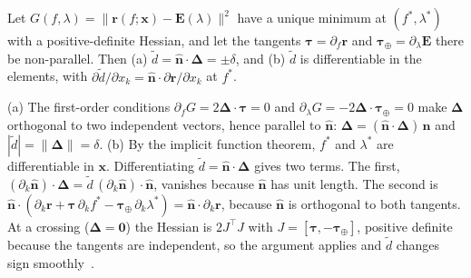 \begin{proposition}\label{prop:grad}
Let $G(f, \lambda) = \lVert\mathbf{r}(f; \mathbf{x}) - \mathbf{E}(\lambda)\rVert^2$ have a unique minimum at $(f^*, \lambda^*)$ with a positive-definite Hessian, and let the tangents $\boldsymbol\tau = \partial_f\mathbf{r}$ and $\boldsymbol\tau_\oplus = \partial_\lambda\mathbf{E}$ there be non-parallel. Then (a) $\tilde d = \hat{\mathbf{n}}\cdot\boldsymbol\Delta = \pm\delta$, and (b) $\tilde d$ is differentiable in the elements, with $\partial\tilde d/\partial x_k = \hat{\mathbf{n}}\cdot\partial\mathbf{r}/\partial x_k$ at $f^*$.
\end{proposition}
\begin{IEEEproof}
(a) The first-order conditions $\partial_f G = 2\boldsymbol\Delta\cdot\boldsymbol\tau = 0$ and $\partial_\lambda G = -2\boldsymbol\Delta\cdot\boldsymbol\tau_\oplus = 0$ make $\boldsymbol\Delta$ orthogonal to two independent vectors, hence parallel to $\hat{\mathbf{n}}$: $\boldsymbol\Delta = (\hat{\mathbf{n}}\cdot\boldsymbol\Delta)\,\hat{\mathbf{n}}$ and $|\tilde d| = \lVert\boldsymbol\Delta\rVert = \delta$. (b) By the implicit function theorem, $f^*$ and $\lambda^*$ are differentiable in $\mathbf{x}$. Differentiating $\tilde d = \hat{\mathbf{n}}\cdot\boldsymbol\Delta$ gives two terms. The first, $(\partial_k\hat{\mathbf{n}})\cdot\boldsymbol\Delta = \tilde d\,(\partial_k\hat{\mathbf{n}})\cdot\hat{\mathbf{n}}$, vanishes because $\hat{\mathbf{n}}$ has unit length. The second is $\hat{\mathbf{n}}\cdot(\partial_k\mathbf{r} + \boldsymbol\tau\,\partial_k f^* - \boldsymbol\tau_\oplus\,\partial_k\lambda^*) = \hat{\mathbf{n}}\cdot\partial_k\mathbf{r}$, because $\hat{\mathbf{n}}$ is orthogonal to both tangents. At a crossing ($\boldsymbol\Delta = \mathbf{0}$) the Hessian is $2J^{\top}J$ with $J = [\boldsymbol\tau, -\boldsymbol\tau_\oplus]$, positive definite because the tangents are independent, so the argument applies and $\tilde d$ changes sign smoothly~\cite{gronchi2007}.
\end{IEEEproof}


